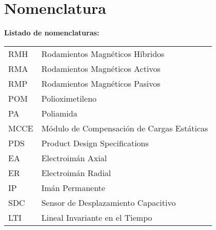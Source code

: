 \chapter{Nomenclatura}

\textbf{Listado de nomenclaturas:}\\


\begin{tabular}{ll}
	RMH\hspace{3cm} & Rodamientos Magn\'eticos H\'ibridos\\
	RMA\hspace{3cm} & Rodamientos Magn\'eticos Activos\\
	RMP\hspace{3cm} & Rodamientos Magn\'eticos Pasivos\\
	POM\hspace{3cm} & Polioximetileno \\
	PA\hspace{3cm} & Poliamida\\
	MCCE\hspace{3cm} & M\'odulo de Compensaci\'on de Cargas Est\'aticas\\
	PDS\hspace{3cm} & Product Design Specifications\\ 
	EA\hspace{3cm} & Electroim\'an Axial\\
	ER\hspace{3cm} & Electroim\'an Radial\\
	IP\hspace{3cm} & Im\'an Permanente\\
	SDC\hspace{3cm} & Sensor de Desplazamiento Capacitivo\\
	LTI\hspace{3cm} & Lineal Invariante en el Tiempo
\end{tabular}

